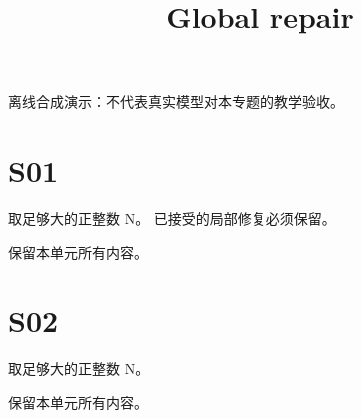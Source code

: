 \documentclass[UTF8,fontset=fandol,11pt]{ctexart}
\title{Global repair}
\date{}
\begin{document}
\maketitle
\par\noindent 离线合成演示：不代表真实模型对本专题的教学验收。\par
\section{S01}\label{sec:S01}
取足够大的正整数 N。 已接受的局部修复必须保留。\par
保留本单元所有内容。\par
\section{S02}\label{sec:S02}
取足够大的正整数 N。\par
保留本单元所有内容。\par
\end{document}
